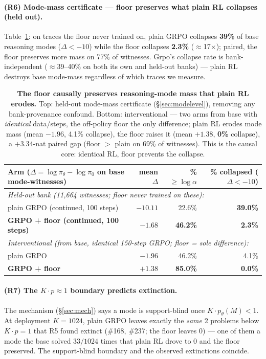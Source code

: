 \documentclass[11pt]{article}
\theoremstyle{definition}
\begin{document}
\paragraph{(R6) Mode-mass certificate --- floor preserves what plain RL collapses (held out).}
Table~\ref{tab:certificate}: on traces the floor never trained on, plain GRPO collapses \textbf{39\%}
of base reasoning modes ($\Delta<-10$) while the floor collapses \textbf{2.3\%} ($\approx$17$\times$);
paired, the floor preserves more mass on 77\% of witnesses. Grpo's collapse rate is
bank-independent ($\approx$39--40\% on both its own and held-out banks) --- plain RL destroys base
mode-mass regardless of which traces we measure.

\begin{table}[h]\centering\small
\begin{tabular}{lrrr}
\toprule
Arm ($\Delta=\log\pi_\theta-\log\pi_0$ on base mode-witnesses) & mean $\Delta$ & \% $\ge\log\alpha$ & \% collapsed ($\Delta<-10$) \\
\midrule
\multicolumn{4}{l}{\emph{Held-out bank (11{,}664 witnesses; floor never trained on these):}}\\
plain GRPO (continued, 100 steps)     & $-10.11$ & 22.6\% & \textbf{39.0\%}\\
\textbf{GRPO + floor (continued, 100 steps)} & $\mathbf{-1.68}$ & \textbf{46.2\%} & \textbf{2.3\%}\\
\midrule
\multicolumn{4}{l}{\emph{Interventional (from base, identical 150-step GRPO; floor = sole difference):}}\\
plain GRPO                             & $-1.96$ & 46.2\% & 4.1\%\\
\textbf{GRPO + floor}                  & $\mathbf{+1.38}$ & \textbf{85.0\%} & \textbf{0.0\%}\\
\bottomrule
\end{tabular}
\caption{\textbf{The floor causally preserves reasoning-mode mass that plain RL erodes.} Top:
held-out mode-mass certificate (\S\ref{sec:modelevel}), removing any bank-provenance confound. Bottom:
interventional --- two arms from base with \emph{identical} data/steps, the off-policy floor the only
difference; plain RL erodes mode mass (mean $-1.96$, 4.1\% collapse), the floor raises it (mean
$+1.38$, \textbf{0\%} collapse), a $+3.34$-nat paired gap (floor $>$ plain on 69\% of witnesses). This
is the causal core: identical RL, floor prevents the collapse.}
\label{tab:certificate}
\end{table}

\paragraph{(R7) The $K\!\cdot\!p\approx1$ boundary predicts extinction.} The mechanism
(\S\ref{sec:mech}) says a mode is support-blind once $K\!\cdot\!p_\theta(M)<1$. At deployment $K{=}1024$,
plain GRPO leaves exactly the \emph{same} 2 problems below $K\!\cdot\!p{=}1$ that R5 found extinct
(\#168, \#237; the floor leaves 0) --- one of them a mode the base solved $33/1024$ times that plain RL
drove to $0$ and the floor preserved. The support-blind boundary and the observed extinctions coincide.
\end{document}
